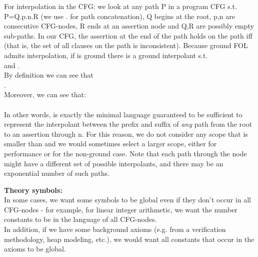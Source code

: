 For interpolation in the CFG: we look at any path P in a program CFG s.t. P=Q.p.n.R  (we use . for path concatenation), Q begins at the root, p,n are consecutive CFG-nodes, R ends at an assertion node and Q,R are possibly empty sub-paths.
In our CFG, the assertion at the end of the path holds on the path iff  (that is, the set of all clauses on the path is inconsistent).
Because ground FOL admits interpolation, if  is ground there is a ground interpolant
 s.t. \\
 and .\\
By definition we can see that \\
.\\
Moreover, we can see that:\\
\\
In other words,  is exactly the minimal language guaranteed to be sufficient to represent the interpolant between the prefix and suffix of \emph{any} path from the root to an assertion through n.
For this reason, we do not consider any scope that is smaller than  and we would sometimes select a larger scope, either for performance or for the non-ground case. Note that each path through the node might have a different set of possible interpolants, and there may be an exponential number of such paths.

\textbf{Theory symbols:}\\
In some cases, we want some symbols to be global even if they don't occur in all CFG-nodes - for example, 
for linear integer arithmetic, we want the number constants to be in the language of all CFG-nodes.\\
In addition, if we have some background axioms (e.g. from a verification methodology, heap modeling, etc.), we would want all constants that occur in the axioms to be global.
